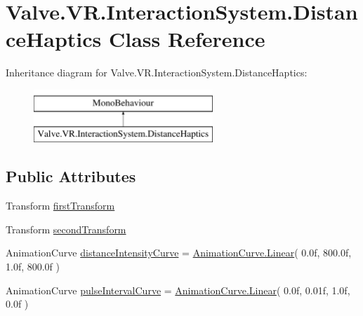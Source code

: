 \hypertarget{class_valve_1_1_v_r_1_1_interaction_system_1_1_distance_haptics}{}\section{Valve.\+V\+R.\+Interaction\+System.\+Distance\+Haptics Class Reference}
\label{class_valve_1_1_v_r_1_1_interaction_system_1_1_distance_haptics}
Inheritance diagram for Valve.\+V\+R.\+Interaction\+System.\+Distance\+Haptics\+:\begin{figure}[H]
\begin{center}
\leavevmode
\includegraphics[height=2.000000cm]{class_valve_1_1_v_r_1_1_interaction_system_1_1_distance_haptics}
\end{center}
\end{figure}
\subsection*{Public Attributes}
\begin{DoxyCompactItemize}
\item 
Transform \mbox{\hyperlink{class_valve_1_1_v_r_1_1_interaction_system_1_1_distance_haptics_aba22c861e9d2798ac7f4ceb9174a9bbb}{first\+Transform}}
\item 
Transform \mbox{\hyperlink{class_valve_1_1_v_r_1_1_interaction_system_1_1_distance_haptics_a34fbf0b5ae8c9f9d88bb38b4348a5189}{second\+Transform}}
\item 
Animation\+Curve \mbox{\hyperlink{class_valve_1_1_v_r_1_1_interaction_system_1_1_distance_haptics_aad2c3737bb10c1836e9b3ac571f564a4}{distance\+Intensity\+Curve}} = \mbox{\hyperlink{namespace_valve_1_1_v_r_aeb0fba37ba28d8ca276d7c10f01809aca32a843da6ea40ab3b17a3421ccdf671b}{Animation\+Curve.\+Linear}}( 0.\+0f, 800.\+0f, 1.\+0f, 800.\+0f )
\item 
Animation\+Curve \mbox{\hyperlink{class_valve_1_1_v_r_1_1_interaction_system_1_1_distance_haptics_a2cd5bb043a441926bd9a4796568ebf9c}{pulse\+Interval\+Curve}} = \mbox{\hyperlink{namespace_valve_1_1_v_r_aeb0fba37ba28d8ca276d7c10f01809aca32a843da6ea40ab3b17a3421ccdf671b}{Animation\+Curve.\+Linear}}( 0.\+0f, 0.\+01f, 1.\+0f, 0.\+0f )
\end{DoxyCompactItemize}


